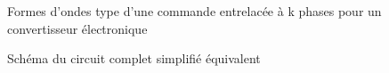 \begin{figure}[htb]
\centering
{}
\caption{Formes d'ondes type d'une commande entrelacée à k phases pour un convertisseur électronique}
\label{fig_entrelacage}
\end{figure}

\begin{figure}[htb]
\centering
{}
\caption{Schéma du circuit complet simplifié équivalent}
\label{fig_circuit_global}
\end{figure}

